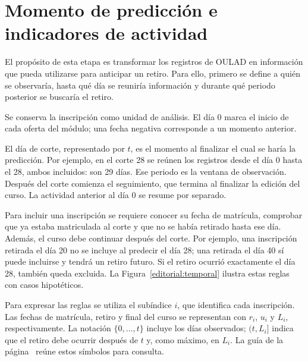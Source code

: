 \label{cap:ingenieria}
\section{Momento de predicción e indicadores de actividad}\label{sec:actividad}
El propósito de esta etapa es transformar los registros de OULAD en información que pueda utilizarse para anticipar un retiro. Para ello, primero se define a quién se observaría, hasta qué día se reuniría información y durante qué periodo posterior se buscaría el retiro.

Se conserva la inscripción como unidad de análisis. El día 0 marca el inicio de cada oferta del módulo; una fecha negativa corresponde a un momento anterior.

El día de corte, representado por $t$, es el momento al finalizar el cual se haría la predicción. Por ejemplo, en el corte 28 se reúnen los registros desde el día 0 hasta el 28, ambos incluidos: son 29 días. Ese periodo es la ventana de observación. Después del corte comienza el seguimiento, que termina al finalizar la edición del curso. La actividad anterior al día 0 se resume por separado.

Para incluir una inscripción se requiere conocer su fecha de matrícula, comprobar que ya estaba matriculada al corte y que no se había retirado hasta ese día. Además, el curso debe continuar después del corte. Por ejemplo, una inscripción retirada el día 20 no se incluye al predecir el día 28; una retirada el día 40 sí puede incluirse y tendrá un retiro futuro. Si el retiro ocurrió exactamente el día 28, también queda excluida. La Figura~\ref{editorial:temporal} ilustra estas reglas con casos hipotéticos.


Para expresar las reglas se utiliza el subíndice $i$, que identifica cada inscripción. Las fechas de matrícula, retiro y final del curso se representan con $r_i$, $u_i$ y $L_i$, respectivamente. La notación $\{0,\ldots,t\}$ incluye los días observados; $(t,L_i]$ indica que el retiro debe ocurrir después de $t$ y, como máximo, en $L_i$. La guía de la página~\pageref{editorial:notacion} reúne estos símbolos para consulta.

